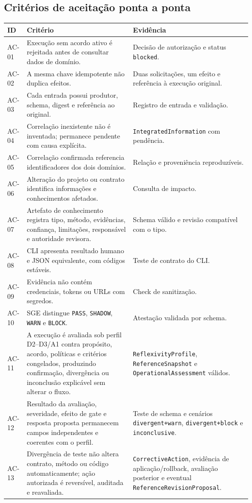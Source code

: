 \documentclass[11pt,a4paper,oneside]{article}
\begin{document}
\subsection{Critérios de aceitação ponta a ponta}
\begin{longtable}{P{1.5cm}P{9.0cm}P{4.1cm}}
\toprule
\textbf{ID} & \textbf{Critério} & \textbf{Evidência} \\
\midrule
\endhead
AC-01 & Execução sem acordo ativo é rejeitada antes de consultar dados de domínio. & Decisão de autorização e status \texttt{blocked}. \\
AC-02 & A mesma chave idempotente não duplica efeitos. & Duas solicitações, um efeito e referência à execução original. \\
AC-03 & Cada entrada possui produtor, schema, digest e referência ao original. & Registro de entrada e validação. \\
AC-04 & Correlação inexistente não é inventada; permanece pendente com causa explícita. & \texttt{IntegratedInformation} com pendência. \\
AC-05 & Correlação confirmada referencia identificadores dos dois domínios. & Relação e proveniência reproduzíveis. \\
AC-06 & Alteração do projeto ou contrato identifica informações e conhecimentos afetados. & Consulta de impacto. \\
AC-07 & Artefato de conhecimento registra tipo, método, evidências, confiança, limitações, responsável e autoridade revisora. & Schema válido e revisão compatível com o tipo. \\
AC-08 & CLI apresenta resultado humano e JSON equivalente, com códigos estáveis. & Teste de contrato do CLI. \\
AC-09 & Evidência não contém credenciais, tokens ou URLs com segredos. & Check de sanitização. \\
AC-10 & SGE distingue \texttt{PASS}, \texttt{SHADOW}, \texttt{WARN} e \texttt{BLOCK}. & Atestação validada por schema. \\
AC-11 & A execução é avaliada sob perfil D2--D3/A1 contra propósito, acordo, políticas e critérios congelados, produzindo confirmação, divergência ou inconclusão explicável sem alterar o fluxo. & \texttt{ReflexivityProfile}, \texttt{ReferenceSnapshot} e \texttt{OperationalAssessment} válidos. \\
AC-12 & Resultado da avaliação, severidade, efeito de gate e resposta proposta permanecem campos independentes e coerentes com o perfil. & Teste de schema e cenários \texttt{divergent+warn}, \texttt{divergent+block} e \texttt{inconclusive}. \\
AC-13 & Divergência de teste não altera contrato, método ou código automaticamente; ação autorizada é reversível, auditada e reavaliada. & \texttt{CorrectiveAction}, evidência de aplicação/rollback, avaliação posterior e eventual \texttt{ReferenceRevisionProposal}. \\
\bottomrule
\end{longtable}
\end{document}
